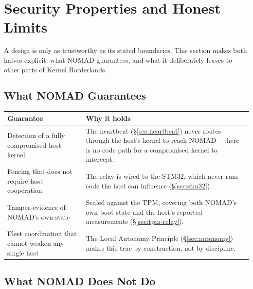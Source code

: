 \documentclass[11pt,a4paper]{article}
\begin{document}
\section{Security Properties and Honest Limits}
\label{sec:properties}

A design is only as trustworthy as its stated boundaries. This section
makes both halves explicit: what NOMAD guarantees, and what it
deliberately leaves to other parts of Kernel Borderlands.

\subsection{What NOMAD Guarantees}

\begin{center}
\renewcommand{\arraystretch}{1.35}
\small
\begin{tabular}{@{}p{5.4cm}p{8.2cm}@{}}
\toprule
\textbf{Guarantee} & \textbf{Why it holds} \\
\midrule
Detection of a fully compromised host kernel & The heartbeat
(\S\ref{sec:heartbeat}) never routes through the host's kernel to
reach NOMAD -- there is no code path for a compromised kernel to
intercept. \\
Fencing that does not require host cooperation & The relay is wired to
the STM32, which never runs code the host can influence
(\S\ref{sec:stm32}). \\
Tamper-evidence of NOMAD's own state & Sealed against the TPM, covering
both NOMAD's own boot state and the host's reported measurements
(\S\ref{sec:tpm-relay}). \\
Fleet coordination that cannot weaken any single host & The Local
Autonomy Principle (\S\ref{sec:autonomy}) makes this true by
construction, not by discipline. \\
\bottomrule
\end{tabular}
\end{center}

\subsection{What NOMAD Does Not Do}
\end{document}
